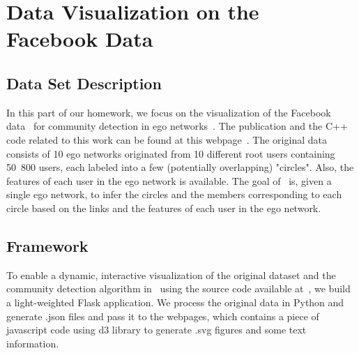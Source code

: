 \section{Data Visualization on the Facebook Data}

\subsection{Data Set Description}
In this part of our homework, we focus on the visualization of the
Facebook data~\cite{facebook} for community detection in ego
networks~\cite{leskovec2012learning}.
The publication and the C++ code related to this work can be found at this
webpage~\cite{homepagemcauley}. The original data consists of 10 ego networks
originated from 10 different root users containing 50~800 users, each labeled into a few
(potentially overlapping) "circles". Also, the features of each user in the ego
network is available. The goal of~\cite{leskovec2012learning} is, given a single
ego network, to infer the circles and the members corresponding to each circle based on the
links and the features of each user in the ego network. 

\subsection{Framework}
To enable a dynamic, interactive visualization of the original dataset and the
community detection algorithm in~\cite{leskovec2012learning} using the source
code available at~\cite{homepagemcauley}, we build a light-weighted
Flask application. We process the original data in Python and generate
.json files and pass it to the webpages, which contains a piece of javascript
code using d3 library to generate .svg figures and some text information.

